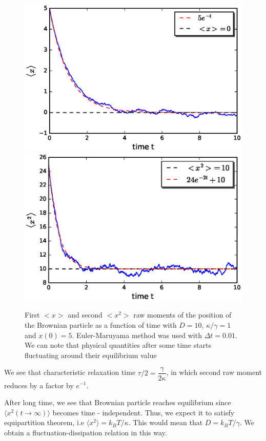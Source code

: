 \documentclass[11pt,a4paper]{article}
\begin{document}
\begin{figure}[!htbp]
\centering
\includegraphics[scale=0.5]{x_brown_mean.eps}
\includegraphics[scale=0.5]{x2_brown.eps}
\caption{ First $<x>$ and second $<x^2>$  raw moments of the position of the Brownian particle as a function of time with $D=10$, $\kappa/\gamma=1$ and $x(0)=5$. Euler-Maruyama method was used with $\Delta t=0.01$. We can note that physical quantities after some time starts fluctuating around their equilibrium value}
\label{varx_brown}
\end{figure}

We see that characteristic relaxation time $\tau/2=\dfrac{\gamma}{2\kappa}$, in which second raw moment reduces by a factor by $e^{-1}$.


After long time, we see that Brownian particle reaches equilibrium since $\langle x^2 (t\rightarrow \infty) \rangle$ becomes time - independent. Thus, we expect it to satisfy equipartition theorem, i.e $ \langle x^2 \rangle = k_B T/ \kappa$. This would mean that $D=k_B T/\gamma$. We obtain a fluctuation-dissipation relation in this way.
\end{document}
